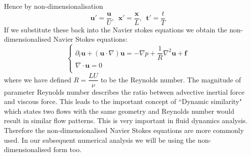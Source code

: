 Hence by non-dimensionalisation
\begin{equation}
\textbf{u}' = \dfrac{\textbf{u}}{U},\,\,\,\textbf{x}' = \dfrac{\textbf{x}}{L},\,\,\,\textbf{t}'=\dfrac{t}{T}
\end{equation}
If we substitute these back into the Navier stokes equations we obtain the non-dimensionalised Navier Stokes equations:
\begin{equation}
\begin{cases}
\partial_t \textbf{u} + (\textbf{u} \cdot \nabla)\textbf{u} = -\nabla p + \dfrac{1}{R}\nabla^2\textbf{u}+\textbf{f}\\
\nabla \cdot \textbf{u}=0\\
\end{cases}
\end{equation}
where we have defined $R = \dfrac{LU}{\nu}$ to be the Reynolds number. The magnitude of parameter Reynolds number describes the ratio between advective inertial force and viscous force. This leads to the important concept of ``Dynamic similarity" which states two flows with the same geometry and Reynolds number would result in similar flow patterns. This is very important in fluid dynamics analysis. Therefore the non-dimensionalised Navier Stokes equations are more commonly used. In our subsequent numerical analysis we will be using the non-dimensionalised form too.

